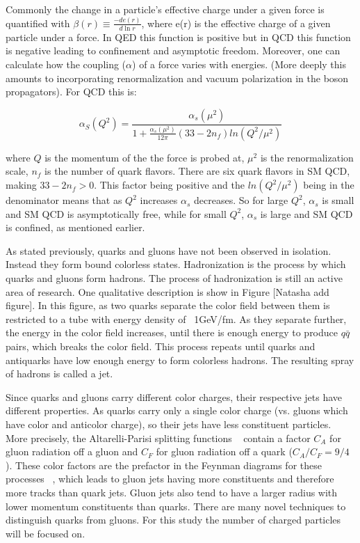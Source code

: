Commonly the change in a particle's effective charge under a given force is quantified with  $\beta(r) \equiv \frac{-de(r)}{d\ln r}$, where e(r) is the effective charge of a given particle under a force. In QED this function is positive but in QCD this function is negative leading to confinement and asymptotic freedom. Moreover, one can calculate how the coupling ($\alpha$) of a force varies with energies. (More deeply this amounts to incorporating renormalization and vacuum polarization in the boson propagators). For QCD this is:

\begin{equation}
\alpha_{S}(Q^{2}) = \frac{ \alpha_{s}(\mu^{2}) } { 1+ \frac{ \alpha_{s}( \mu^{2} ) } { 12\pi } ( 33-2n_{f} ) ln( Q^{2}/\mu^{2})}  
\end{equation}


where $Q$ is the momentum of the the force is probed at, $\mu^{2}$ is the renormalization scale, $n_{f}$ is the number of quark flavors. There are six quark flavors in SM QCD, making $33-2n_{f} > 0$. This factor being positive and the $ln(Q^{2}/\mu^{2})$  being in the denominator means that as $Q^{2}$ increases $\alpha_{s}$ decreases. So for large $Q^{2}$, $\alpha_{s}$ is small and SM QCD is asymptotically free, while for small $Q^{2}$, $\alpha_{s}$ is large and SM QCD is confined, as mentioned earlier. 

As stated previously, quarks and gluons have not been observed in isolation. Instead they form bound colorless states. Hadronization is the process by which quarks and gluons form hadrons. The process of hadronization is still an active area of research. One qualitative description is show in Figure [Natasha add figure]. In this figure, as two quarks separate the color field between them is restricted to a tube with energy density of ~1GeV/fm. As they separate further, the energy in the color field increases, until there is enough energy to produce $q\bar{q}$ pairs, which breaks the color field. This process repeats until quarks and antiquarks have low enough energy to form colorless hadrons. The resulting spray of hadrons is called a jet.

Since quarks and gluons carry different color charges, their respective jets have different properties. As quarks carry only a single color charge (vs. gluons which have color and anticolor charge), so their jets have less constituent particles. More precisely, the Altarelli-Parisi splitting functions ~\cite{altarelli} contain a factor $C_{A}$ for gluon radiation off a gluon and $C_{F}$ for gluon radiation off a quark ($C_{A}/C_{F} = 9/4$). These color factors are the prefactor in the Feynman diagrams for these processes ~\cite{colorfactor}, which leads to gluon jets having more constituents and therefore more tracks than quark jets. Gluon jets also tend to have a larger radius with lower momentum constituents than quarks. There are many novel techniques to distinguish quarks from gluons. For this study the number of charged particles will be focused on.  


